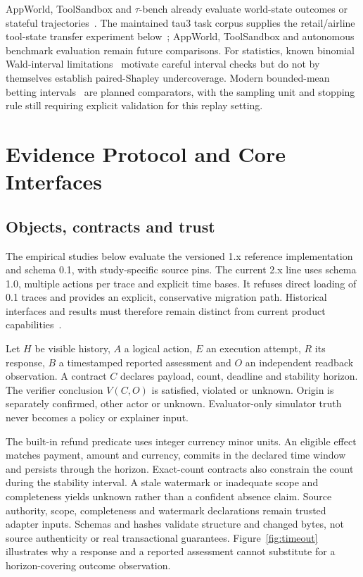 \documentclass[conference]{IEEEtran}
\begin{document}
AppWorld, ToolSandbox and $\tau$-bench already evaluate world-state outcomes
or stateful trajectories~\cite{appworld,toolsandbox,taubench}. The maintained
tau3 task corpus supplies the retail/airline tool-state transfer experiment
below~\cite{tau3tasks}; AppWorld, ToolSandbox and autonomous benchmark
evaluation remain future comparisons. For statistics, known binomial Wald-interval limitations~\cite{brown} motivate
careful interval checks but do not by themselves establish paired-Shapley
undercoverage. Modern bounded-mean betting intervals~\cite{betting} are planned
comparators, with the sampling unit and stopping rule still requiring explicit
validation for this replay setting.

\section{Evidence Protocol and Core Interfaces}
\subsection{Objects, contracts and trust}
The empirical studies below evaluate the versioned 1.x reference
implementation and schema 0.1, with study-specific source pins. The current
2.x line uses schema 1.0, multiple actions per trace and explicit time
bases. It refuses direct loading of 0.1 traces and provides an explicit,
conservative migration path. Historical interfaces and results must therefore
remain distinct from current product capabilities~\cite{experimentartifact,artifact}.

Let $H$ be visible history, $A$ a logical action, $E$ an execution attempt,
$R$ its response, $B$ a timestamped reported assessment and $O$ an independent
readback observation. A contract $C$ declares payload, count, deadline and
stability horizon. The verifier conclusion $V(C,O)$ is satisfied, violated or
unknown. Origin is separately confirmed, other actor or unknown. Evaluator-only
simulator truth never becomes a policy or explainer input.

The built-in refund predicate uses integer currency minor units. An eligible
effect matches payment, amount and currency, commits in the declared time
window and persists through the horizon. Exact-count contracts also constrain
the count during the stability interval. A stale watermark or inadequate scope
and completeness yields unknown rather than a confident absence claim.
Source authority, scope, completeness and watermark declarations remain trusted
adapter inputs. Schemas and hashes validate structure and changed bytes, not
source authenticity or real transactional guarantees.
Figure~\ref{fig:timeout} illustrates why a response and a reported assessment
cannot substitute for a horizon-covering outcome observation.
\end{document}
